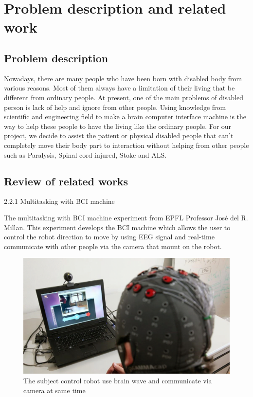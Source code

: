 \chapter{Problem description and related work}

\label{ch:Problem description and related work}

\setlength{\parindent}{4em}
\setlength{\parskip}{1em}
\renewcommand{\baselinestretch}{1.5}

\section{Problem description}
\hspace{1.5cm} Nowadays, there are many people who have been born with disabled body from various reasons. Most of them always have a limitation of their living that be different from ordinary people. At present, one of the main problems of disabled person is lack of help and ignore from other people. Using knowledge from scientific and engineering field to make a brain computer interface machine is the way to help these people to have the living like the ordinary people. For our project, we decide to assist the patient or physical disabled people that can't completely move their body part to interaction without helping from other people such as Paralysis, Spinal cord injured, Stoke and ALS.

\section{Review of related works}
\hspace{1.5cm} 2.2.1 Multitasking with BCI machine\cite{tow}

The multitasking with BCI machine experiment from EPFL Professor José del R. Millan. This experiment develops the BCI machine which allows the user to control the robot direction to move by using EEG signal and real-time communicate with other people via the camera that mount on the robot.
\begin{figure}[h]
	\centering
  	\includegraphics[scale = 0.4]{21.pdf}
  	\caption{The subject control robot use brain wave and communicate via camera at same time}
\end{figure}

